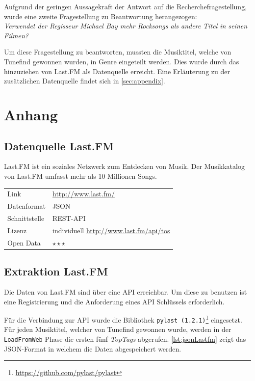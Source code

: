 \documentclass[parskip]{scrartcl}
\begin{document}
Aufgrund der geringen Aussagekraft der Antwort auf die Recherchefragestellung, wurde eine zweite Fragestellung zu Beantwortung herangezogen:\\
\textit{Verwendet der Regisseur Michael Bay mehr Rocksongs als andere Titel in seinen Filmen?}

Um diese Fragestellung zu beantworten, mussten die Musiktitel, welche von Tunefind gewonnen wurden, in Genre eingeteilt werden. Dies wurde durch das hinzuziehen von Last.FM als Datenquelle erreicht. Eine Erläuterung zu der zusätzlichen Datenquelle findet sich in \autoref{sec:appendix}.

\pagebreak
\section{Anhang}
\label{sec:appendix}

\subsection{Datenquelle Last.FM}

Last.FM ist ein soziales Netzwerk zum Entdecken von Musik. Der Musikkatalog von Last.FM umfasst mehr als 10 Millionen Songs.

\begin{tabular}{l|p{9cm}}
    Link & \url{http://www.last.fm/} \\
    Datenformat & JSON \\
    Schnittstelle & REST-API \\
    Lizenz & individuell \href{http://www.last.fm/api/tos}{http://www.last.fm/api/tos} \\
    Open Data & $\star\star\star$ \\
\end{tabular}

\subsection{Extraktion Last.FM}

Die Daten von Last.FM sind über eine API erreichbar. Um diese zu benutzen ist eine Registrierung und die Anforderung eines API Schlüssels erforderlich.

Für die Verbindung zur API wurde die Bibliothek \texttt{pylast (1.2.1)}\footnote{\href{https://github.com/pylast/pylast}{https://github.com/pylast/pylast}} eingesetzt. Für jeden Musiktitel, welcher von Tunefind gewonnen wurde, werden in der \texttt{LoadFromWeb}-Phase die ersten fünf \textit{TopTags} abgerufen. \autoref{lst:jsonLastfm} zeigt das JSON-Format in welchem die Daten abgespeichert werden.
\end{document}
